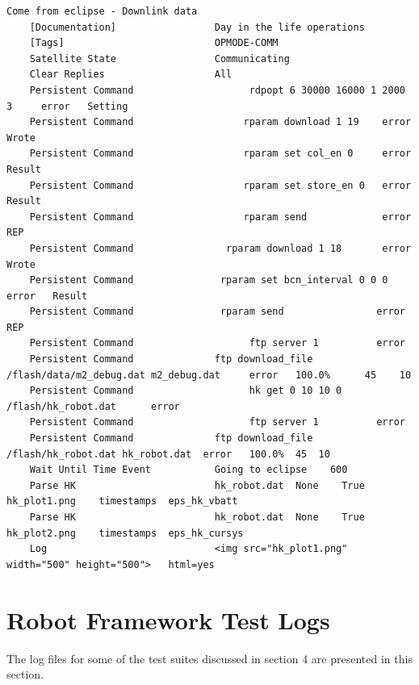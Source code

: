 \documentclass[english,12pt,a4paper,pdftex,elec,utf8]{aaltothesis}
\begin{document}
\begin{verbatim}
Come from eclipse - Downlink data
    [Documentation]                 Day in the life operations
    [Tags]                          OPMODE-COMM
    Satellite State                 Communicating
    Clear Replies                   All
    Persistent Command                    rdpopt 6 30000 16000 1 2000 3     error   Setting
    Persistent Command                   rparam download 1 19    error      Wrote
    Persistent Command                   rparam set col_en 0     error      Result
    Persistent Command                   rparam set store_en 0   error      Result
    Persistent Command                   rparam send             error      REP
    Persistent Command                rparam download 1 18       error      Wrote
    Persistent Command               rparam set bcn_interval 0 0 0      error   Result
    Persistent Command               rparam send                error               REP
    Persistent Command                    ftp server 1          error
    Persistent Command              ftp download_file /flash/data/m2_debug.dat m2_debug.dat     error   100.0%      45    10
    Persistent Command                    hk get 0 10 10 0 /flash/hk_robot.dat      error
    Persistent Command                    ftp server 1          error
    Persistent Command              ftp download_file /flash/hk_robot.dat hk_robot.dat  error   100.0%  45  10
    Wait Until Time Event           Going to eclipse    600
    Parse HK                        hk_robot.dat  None    True    hk_plot1.png    timestamps  eps_hk_vbatt
    Parse HK                        hk_robot.dat  None    True    hk_plot2.png    timestamps  eps_hk_cursys
    Log                             <img src="hk_plot1.png" width="500" height="500">   html=yes

\end{verbatim}
\clearpage
\section{Robot Framework Test Logs\label{LiiteC}}
The log files for some of the test suites discussed in section 4 are presented in this section.
\end{document}
